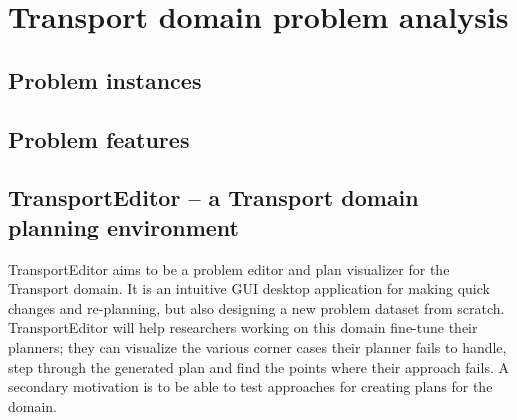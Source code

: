 \chapter{Transport domain problem analysis}

\section{Problem instances}


\section{Problem features}

\section{TransportEditor -- a Transport domain planning environment}

TransportEditor aims to be a problem editor and plan visualizer for the Transport domain.
It is an intuitive GUI desktop application for making quick changes and re-planning, but also designing a new problem dataset from scratch. TransportEditor will help researchers working on this domain fine-tune their planners; they can visualize the various corner cases their planner fails to handle, step through the generated plan and find the points where their approach fails.
A secondary motivation is to be able to test approaches for creating plans for the domain.

